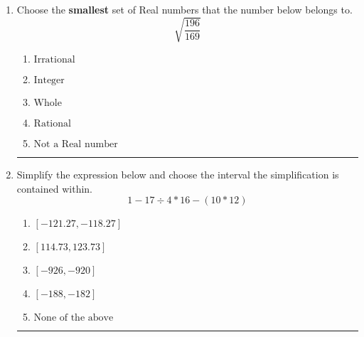 \documentclass[14pt]{extbook}
\newcommand{\litem}[1]{\item#1\hspace*{-1cm}\rule{\textwidth}{0.4pt}}
\begin{document}
\begin{enumerate}
{\begin{enumerate}[label=\Alph*.]
\end{enumerate} }
\litem{
Choose the \textbf{smallest} set of Real numbers that the number below belongs to.\[ \sqrt{\frac{196}{169}} \]\begin{enumerate}[label=\Alph*.]
\item \( \text{Irrational} \)
\item \( \text{Integer} \)
\item \( \text{Whole} \)
\item \( \text{Rational} \)
\item \( \text{Not a Real number} \)

\end{enumerate} }
\litem{
Simplify the expression below and choose the interval the simplification is contained within.\[ 1 - 17 \div 4 * 16 - (10 * 12) \]\begin{enumerate}[label=\Alph*.]
\item \( [-121.27, -118.27] \)
\item \( [114.73, 123.73] \)
\item \( [-926, -920] \)
\item \( [-188, -182] \)
\item \( \text{None of the above} \)

\end{enumerate} }
\end{enumerate}
\end{document}
